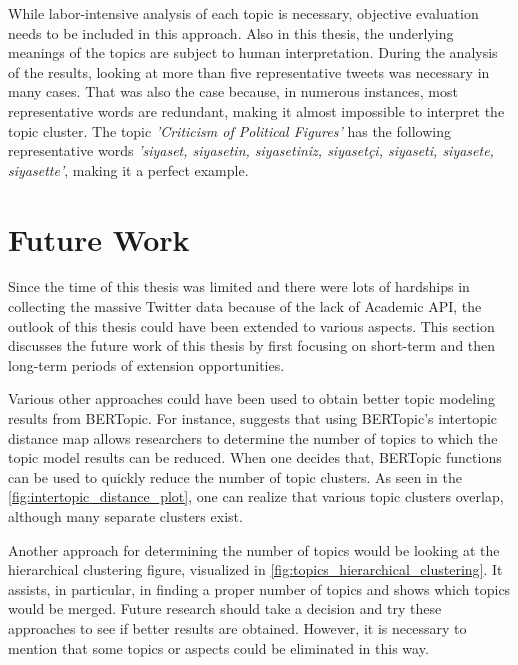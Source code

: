 While labor-intensive analysis of each topic is necessary, objective evaluation needs to be included in this approach. 
Also in this thesis, the underlying meanings of the topics are subject to human interpretation. During the 
analysis of the results, looking at more than five representative tweets was 
necessary in many cases. That was also the case because, in numerous instances, most representative words are 
redundant, making it almost impossible to interpret the topic cluster. The topic 
\textit{'Criticism of Political Figures'} has the following representative words 
\textit{'siyaset, siyasetin, siyasetiniz, siyasetçi, siyaseti, siyasete, siyasette'}, making it a perfect 
example.

\section{Future Work}\label{section:future_work}


Since the time of this thesis was limited and there were lots of hardships in collecting the massive 
Twitter data because of the lack of Academic API, the outlook of this thesis could have been 
extended to various aspects. This section discusses the future work of this thesis by first focusing 
on short-term and then long-term periods of extension opportunities.

Various other approaches could have been used to obtain better topic modeling results from BERTopic. 
For instance, \textcite{topic_model_comparison_bertopic_2022} suggests that using BERTopic's 
intertopic distance map allows researchers to determine the number of topics to which the topic 
model results can be reduced. When one decides that, BERTopic functions can be used to quickly 
reduce the number of topic clusters. As seen in the \autoref{fig:intertopic_distance_plot}, 
one can realize that various topic clusters overlap, although many separate clusters exist. 

Another approach for determining the number of topics would be looking at the hierarchical 
clustering figure, visualized in \autoref{fig:topics_hierarchical_clustering}. It assists, 
in particular, in finding a proper number of topics and shows which topics would be merged.
Future research should take a decision and try these approaches to see if better results are 
obtained. However, it is necessary to mention that some topics or aspects could be eliminated in 
this way.

